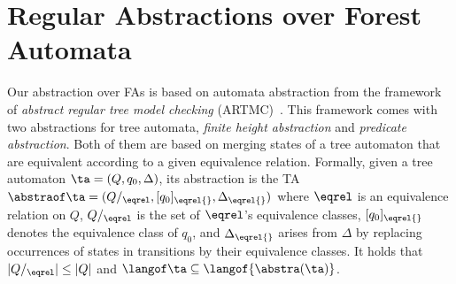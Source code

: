 {%

\section{Regular Abstractions over Forest Automata}\label{sec:abstraction}

Our abstraction over FAs is based on automata abstraction
from the framework of \emph{abstract regular tree model checking}
(ARTMC)~\cite{artmc}.
This framework comes with two abstractions for tree automata, 
\emph{finite height abstraction} and \emph{predicate abstraction}.
Both of them are based on merging states of a tree automaton that are equivalent
according to a given equivalence relation. 
%
Formally, given a tree automaton $\ta=(Q, q_0, \Delta)$, 
its abstraction 
%
%
%
is the TA
$\abstraof \ta =( Q/_{\eqrel},[q_0]_{\eqrel{}},\Delta_{\eqrel{}} )$
where $\eqrel$ is an equivalence relation on $Q$, $Q/_{\eqrel}$ is the set of
$\eqrel$'s equivalence classes, $[q_0]_{\eqrel{}}$ denotes the equivalence class
of $q_0$,  and $\Delta_{\eqrel{}}$ arises from $\Delta$ by replacing
occurrences of states in transitions by their equivalence classes.
%
%
It holds that $|Q/_{\eqrel}| \leq |Q|$ and
$\langof \ta \subseteq \langof{\abstra(\ta)}$.
%

}
